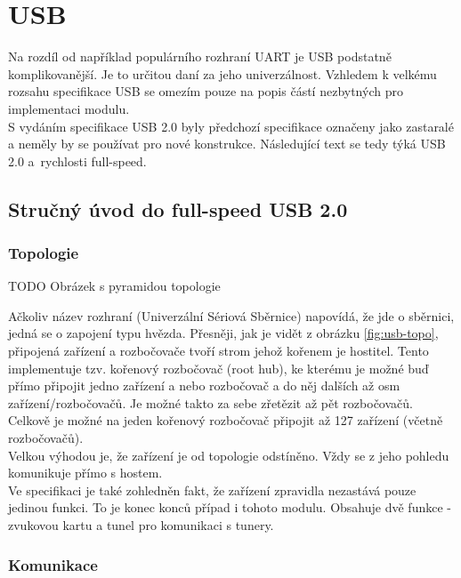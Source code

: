 \section{USB}
\label{sec:USB}
Na rozdíl od například populárního rozhraní UART je USB podstatně komplikovanější. Je to určitou daní za jeho univerzálnost. Vzhledem k velkému rozsahu specifikace USB \cite{usb-spec} se omezím pouze na popis částí nezbytných pro implementaci modulu.\\
S vydáním specifikace USB 2.0 byly předchozí specifikace označeny jako zastaralé a neměly by se používat pro nové konstrukce. Následující text se tedy týká USB 2.0 a~rychlosti full-speed.



\subsection{Stručný úvod do full-speed USB 2.0}
\subsubsection{Topologie}

TODO Obrázek s pyramidou topologie

Ačkoliv název rozhraní (Univerzální Sériová Sběrnice) napovídá, že jde o sběrnici, jedná se o zapojení typu hvězda. Přesněji, jak je vidět z obrázku \ref{fig:usb-topo}, připojená zařízení a rozbočovače tvoří strom jehož kořenem je hostitel. Tento implementuje tzv. kořenový rozbočovač (root hub), ke kterému je možné buď přímo připojit jedno zařízení a nebo rozbočovač a do něj dalších až osm zařízení/rozbočovačů. Je možné takto za sebe zřetězit až pět rozbočovačů. Celkově je možné na jeden kořenový rozbočovač připojit až 127 zařízení (včetně rozbočovačů).\\
Velkou výhodou je, že zařízení je od topologie odstíněno. Vždy se z jeho pohledu komunikuje přímo s hostem.\\
Ve specifikaci je také zohledněn fakt, že zařízení zpravidla nezastává pouze jedinou funkci. To je konec konců případ i tohoto modulu. Obsahuje dvě funkce - zvukovou kartu a \iic tunel pro komunikaci s tunery.

\subsubsection{Komunikace}

